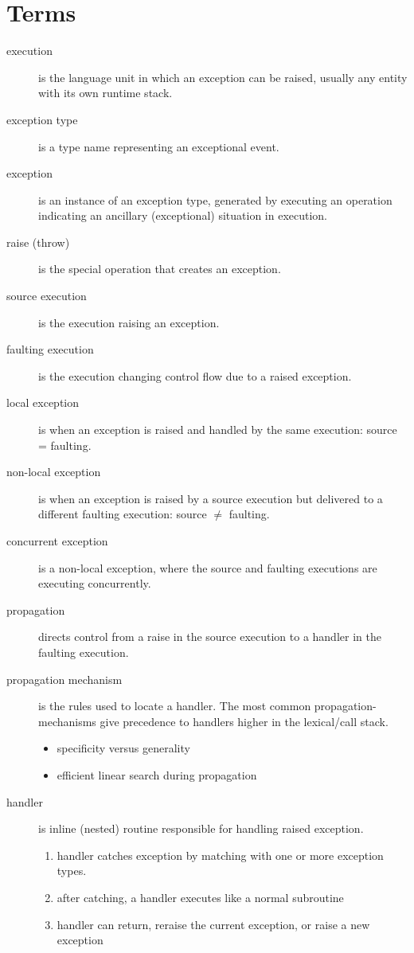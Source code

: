 \documentclass[12pt]{article}
\begin{document}
\section{Terms}
\begin{description}
\item[execution] is the language unit in which an exception can be raised, usually any entity with its own runtime stack.
\item[exception type] is a type name representing an exceptional event.
\item[exception] is an instance of an exception type, generated by executing an operation indicating an ancillary (exceptional) situation in execution.
\item[raise (throw)] is the special operation that creates an exception.
\item[source execution] is the execution raising an exception.
\item[faulting execution] is the execution changing control flow due to a raised exception.
\item[local exception] is when an exception is raised and handled by the same execution: source = faulting.
\item[non-local exception] is when an exception is raised by a source execution but delivered to a different faulting execution: source $\neq$ faulting.
\item[concurrent exception] is a non-local exception, where the source and faulting executions are executing concurrently.
\item[propagation] directs control from a raise in the source execution to a handler in the faulting execution.
\item[propagation mechanism] is the rules used to locate a handler. The most common propagation-mechanisms give precedence to handlers higher in the lexical/call stack.
\begin{itemize}
\item specificity versus generality
\item efficient linear search during propagation
\end{itemize}
\item[handler] is inline (nested) routine responsible for handling raised exception.
\begin{enumerate}
\item handler catches exception by matching with one or more exception types.
\item after catching, a handler executes like a normal subroutine
\item handler can return, reraise the current exception, or raise a new exception

\end{enumerate}
\end{description}
\end{document}
